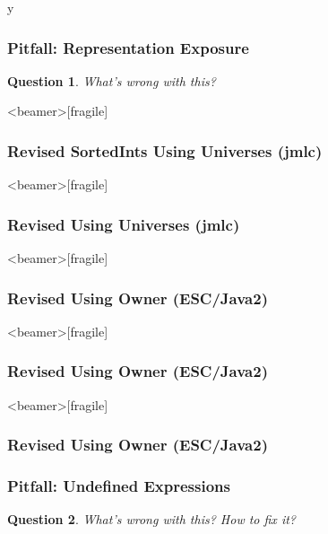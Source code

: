 \if y\MAKEHANDOUTS \documentclass[t,compress,landscape,handout]{beamer}
\newtheorem*{question}{Question}
\begin{document}
\begin{frame}[fragile]
\frametitle{Pitfall: Representation Exposure}

\begin{question}
What's wrong with this? 

\rm


\end{question}
\end{frame}

\begin{frame}<beamer>[fragile]
\frametitle{Revised SortedInts Using Universes (jmlc)}


\end{frame}

\begin{frame}<beamer>[fragile]
\frametitle{Revised Using Universes (jmlc)}


\end{frame}

\begin{frame}<beamer>[fragile]
\frametitle{Revised Using Owner (ESC/Java2)}


\end{frame}

\begin{frame}<beamer>[fragile]
\frametitle{Revised Using Owner (ESC/Java2)}


\end{frame}

\begin{frame}<beamer>[fragile]
\frametitle{Revised Using Owner (ESC/Java2)}


\end{frame}

\begin{frame}
\frametitle{Pitfall: Undefined Expressions}
\begin{question}
What's wrong with this? How to fix it?

\rm

\end{question}
\end{frame}
\end{document}
